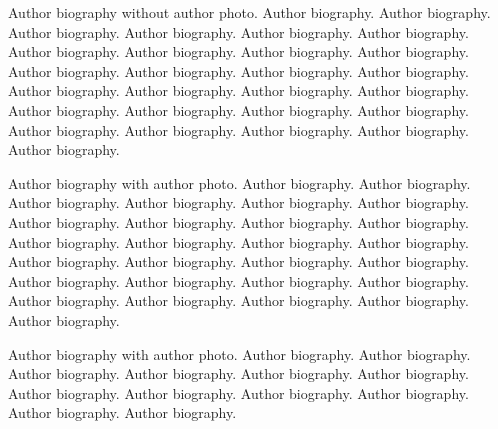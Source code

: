 \documentclass[a4paper,fleqn]{cas-sc}
\begin{document}

\bio{}
Author biography without author photo.
Author biography. Author biography. Author biography.
Author biography. Author biography. Author biography.
Author biography. Author biography. Author biography.
Author biography. Author biography. Author biography.
Author biography. Author biography. Author biography.
Author biography. Author biography. Author biography.
Author biography. Author biography. Author biography.
Author biography. Author biography. Author biography.
Author biography. Author biography. Author biography.
\endbio

Author biography with author photo.
Author biography. Author biography. Author biography.
Author biography. Author biography. Author biography.
Author biography. Author biography. Author biography.
Author biography. Author biography. Author biography.
Author biography. Author biography. Author biography.
Author biography. Author biography. Author biography.
Author biography. Author biography. Author biography.
Author biography. Author biography. Author biography.
Author biography. Author biography. Author biography.
\endbio

\vskip3pc

Author biography with author photo.
Author biography. Author biography. Author biography.
Author biography. Author biography. Author biography.
Author biography. Author biography. Author biography.
Author biography. Author biography. Author biography.
\endbio
\end{document}
